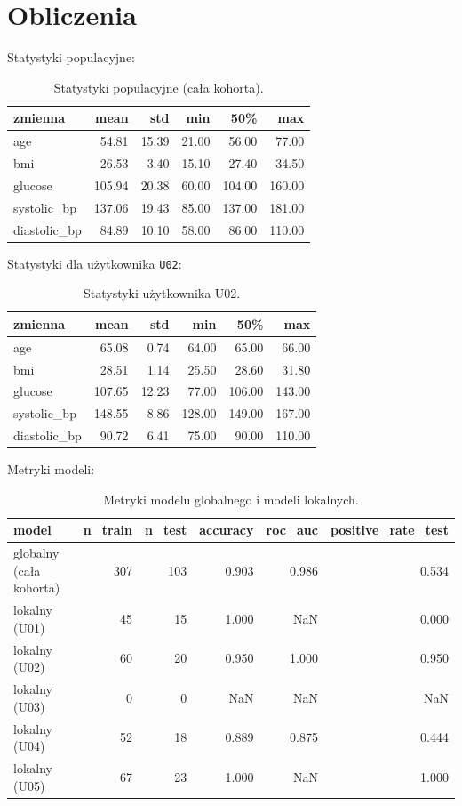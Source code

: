 \documentclass[12pt,a4paper]{article}
\begin{document}
\section{Obliczenia}
Statystyki populacyjne:

\begin{table}[H]
\centering
\begin{tabular}{lrrrrr}
\toprule
zmienna & mean & std & min & 50\% & max \\
\midrule
age & 54.81 & 15.39 & 21.00 & 56.00 & 77.00 \\
bmi & 26.53 & 3.40 & 15.10 & 27.40 & 34.50 \\
glucose & 105.94 & 20.38 & 60.00 & 104.00 & 160.00 \\
systolic\_bp & 137.06 & 19.43 & 85.00 & 137.00 & 181.00 \\
diastolic\_bp & 84.89 & 10.10 & 58.00 & 86.00 & 110.00 \\
\bottomrule
\end{tabular}

\caption{Statystyki populacyjne (cała kohorta).}
\label{tab:pop}
\end{table}

Statystyki dla użytkownika \texttt{U02}:

\begin{table}[H]
\centering
\begin{tabular}{lrrrrr}
\toprule
zmienna & mean & std & min & 50\% & max \\
\midrule
age & 65.08 & 0.74 & 64.00 & 65.00 & 66.00 \\
bmi & 28.51 & 1.14 & 25.50 & 28.60 & 31.80 \\
glucose & 107.65 & 12.23 & 77.00 & 106.00 & 143.00 \\
systolic\_bp & 148.55 & 8.86 & 128.00 & 149.00 & 167.00 \\
diastolic\_bp & 90.72 & 6.41 & 75.00 & 90.00 & 110.00 \\
\bottomrule
\end{tabular}

\caption{Statystyki użytkownika U02.}
\label{tab:user}
\end{table}

Metryki modeli:

\begin{table}[H]
\centering
\begin{tabular}{lrrrrr}
\toprule
model & n\_train & n\_test & accuracy & roc\_auc & positive\_rate\_test \\
\midrule
globalny (cała kohorta) & 307 & 103 & 0.903 & 0.986 & 0.534 \\
lokalny (U01) & 45 & 15 & 1.000 & NaN & 0.000 \\
lokalny (U02) & 60 & 20 & 0.950 & 1.000 & 0.950 \\
lokalny (U03) & 0 & 0 & NaN & NaN & NaN \\
lokalny (U04) & 52 & 18 & 0.889 & 0.875 & 0.444 \\
lokalny (U05) & 67 & 23 & 1.000 & NaN & 1.000 \\
\bottomrule
\end{tabular}

\caption{Metryki modelu globalnego i modeli lokalnych.}
\label{tab:models}
\end{table}
\end{document}
